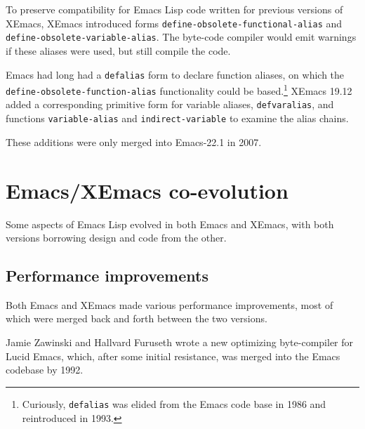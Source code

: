 \documentclass[format=acmsmall, review]{acmart}
\newcommand \Elisp {Emacs Lisp}
\begin{document}
To preserve compatibility for \Elisp{} code written for previous
versions of XEmacs, XEmacs introduced forms
\texttt{define-obsolete-functional-alias} and
\texttt{define-obsolete-variable-alias}.  The byte-code compiler would
emit warnings if these aliases were used, but still compile the code.

Emacs had long had a \texttt{defalias} form to declare function
aliases, on which the \texttt{define-\linebreak[0]obsolete-\linebreak[0]function-\linebreak[0]alias}
functionality could be based.\footnote{Curiously, \texttt{defalias}
  was elided from the Emacs code base in 1986 and reintroduced in
  1993.}  XEmacs 19.12 added a corresponding primitive form for variable
aliases, \texttt{defvaralias}, and functions \texttt{variable-alias}
and \texttt{indirect-variable} to examine the alias chains.

These additions were only merged into Emacs-22.1 in 2007.

\section{Emacs/XEmacs co-evolution}
\label{sec:coevolution}

Some aspects of \Elisp{} evolved in both Emacs and XEmacs, with both
versions borrowing design and code from the other.

\subsection{Performance improvements}

Both Emacs and XEmacs made various performance improvements, most of
which were merged back and forth between the two versions.

Jamie Zawinski and Hallvard Furuseth wrote a new optimizing
byte-compiler for Lucid Emacs, which, after some initial resistance, was
merged into the Emacs codebase by 1992.
\end{document}
